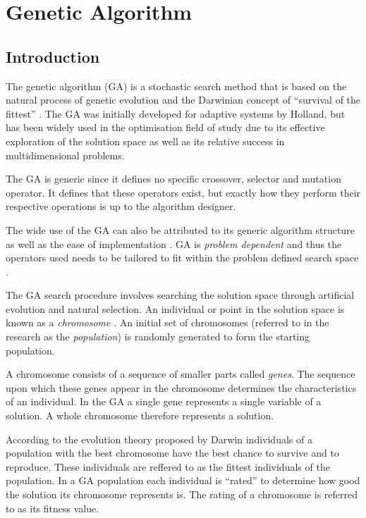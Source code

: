 \section{Genetic Algorithm}
\label{sec:geneticalgorithm}
\subsection{Introduction}
The genetic algorithm (GA) is a stochastic search method that is based on the natural process of genetic evolution and the Darwinian concept of ``survival of the fittest'' \cite{DistributedHierarchicalGA,AcceleratingGA,AdaptiveSAGA,FamilyGA}. The GA was initially developed for adaptive systems by Holland, but has been widely used in the optimisation field of study due to its effective exploration of the solution space as well as its relative success in multidimensional problems\cite{ParallelGASA,DistributedHierarchicalGA,FamilyGA}. 

The GA is generic since it defines no specific crossover, selector and mutation operator. It defines that these operators exist, but exactly how they perform their respective operations is up to the algorithm designer.

The wide use of the GA can also be attributed to its generic algorithm structure as well as the ease of implementation \cite{FamilyGA,AdaptiveSAGA}. GA is \emph{problem dependent} and thus the operators used needs to be tailored to fit within the problem defined search space \cite{AcceleratingGA}.

The GA search procedure involves searching the solution space through artificial evolution and natural selection\cite{FamilyGA,MultiPopGA,HybridIntelliGA}. An individual or point in the solution space is known as a \emph{chromosome} \cite{HumanPassiveGA}. An initial set of chromosomes (referred to in the research as the \emph{population}) is randomly generated to form the starting population\cite{FamilyGA,HybridIntelliGA,AcceleratingGA,MultiPopGA}. 

A chromosome consists of a sequence of smaller parts called \emph{genes}\cite{CompuIntelligenceIntro}. The sequence upon which these genes appear in the chromosome determines the characteristics of an individual\cite{CompuIntelligenceIntro}. In the GA a single gene represents a single variable of a solution\cite{FamilyGA,AcceleratingGA}. A whole chromosome therefore represents a solution\cite{FamilyGA,AcceleratingGA}. 

According to the evolution theory proposed by Darwin individuals of a population with the best chromosome have the best chance to survive and to reproduce\cite{CompuIntelligenceIntro}. These individuals are reffered to as the fittest individuals of the population. In a GA population each individual is ``rated'' to determine how good the solution its chromosome represents is\cite{CompuIntelligenceIntro}. The rating of a chromosome is referred to as its fitness value\cite{CompuIntelligenceIntro}.

